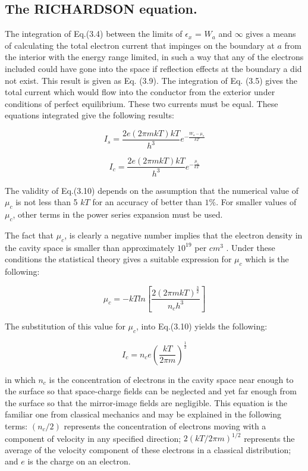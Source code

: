 \documentclass[11pt,a4paper]{article}
\begin{document}
	\subsection{The RICHARDSON equation.}
	
	The integration of Eq.(3.4) between the
	limits of $\epsilon_x$  = $W_a$ and $\infty$ gives a means of calculating the total electron current
	that impinges on the boundary at $a$ from the interior with the energy range limited, in such a way that any of the electrons included could have gone into the
	space if reflection effects at the boundary a did not exist. This result is given
	as Eq. (3.9). The integration of Eq. (3.5) gives the total current which would
	flow into the conductor from the exterior under conditions of perfect equilibrium.
	These two currents must be equal. These equations integrated give the following results:
	
	\begin{equation}
		I_s = \frac{2e(2\pi m kT)k T}{h^3} e^{-\frac{W_a - \mu_s}{kT}}
	\end{equation}
	
	\begin{equation}
	I_c = \frac{2e(2\pi m kT)k T}{h^3} e^{-\frac{\mu_c}{kT}}
	\end{equation}	
	
	The validity of Eq.(3.10) depends on the assumption that the numerical value
	of $\mu_c$ is not less than 5 $kT$ for an accuracy of better than $1\%$. For smaller values of $\mu_c$, other terms in the power series expansion must be used.
	
	The fact that $\mu_c$, is clearly a negative number implies that the electron density
	in the cavity space is smaller than approximately $10^{19}$ per $cm^3$ . Under these
	conditions the statistical theory gives a suitable expression for $\mu_c$ which is the
	following:
	
	\begin{equation}
		\mu_c = - kT ln[\frac{2(2\pi mkT)^{\frac{3}{2}}}{n_c h^3}]
	\end{equation}
	
	The substitution of this value for $\mu_c$, into Eq.(3.10) yields the following:
	
	\begin{equation}
		I_c = n_c e (\frac{kT}{2 \pi m})^{\frac{1}{2}}		
	\end{equation}
	
	in which $n_c$ is the concentration of electrons in the cavity space near enough to
	the surface so that space-charge fields can be neglected and yet far enough from
	the surface so that the mirror-image fields are negligible. This equation is the
	familiar one from classical mechanics and may be explained in the following
	terms: $(n_c/2)$ represents the concentration of electrons moving with a component
	of velocity in any specified direction; $2 (k T/2 \pi m)^{1/2}$ represents the average of the
	velocity component of these electrons in a classical distribution; and $e$ is the charge
	on an electron.
	
\end{document}
